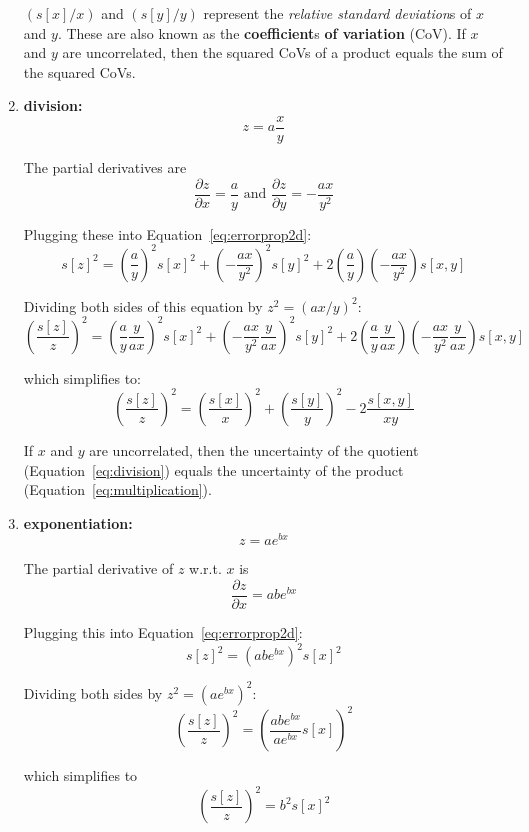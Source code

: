\begin{enumerate}
  $(s[x]/x)$ and $(s[y]/y)$ represent the \textit{relative standard
    deviation}s of $x$ and $y$. These are also known as the
  \textbf{coefficient}s \textbf{of variation} (CoV).  If $x$ and $y$
  are uncorrelated, then the squared CoVs of a product equals the sum
  of the squared CoVs.

\item{\bf division:}
  \[
  z = a \frac{x}{y}
  \]

  The partial derivatives are
  \[
  \frac{\partial z}{\partial x} = \frac{a}{y} \mbox{~and~}
  \frac{\partial z}{\partial y} = -\frac{a x}{y^2}
  \]

  Plugging these into Equation~\ref{eq:errorprop2d}:
  \[
  s[z]^2 = \left(\frac{a}{y}\right)^2 s[x]^2 +
  \left(-\frac{a x}{y^2}\right)^2 s[y]^2 +
  2\left(\frac{a}{y}\right)\left(-\frac{a x}{y^2}\right) s[x,y]
  \]

  Dividing both sides of this equation by $z^2 =
  \left(a x / y\right)^2$:
  \[
  \left(\frac{s[z]}{z}\right)^2 =
  \left(\frac{a}{y}\frac{y}{ax}\right)^2 s[x]^2 +
  \left(-\frac{a x}{y^2}\frac{y}{ax}\right)^2 s[y]^2 +
  2\left(\frac{a}{y}\frac{y}{ax}\right)
  \left(-\frac{a x}{y^2}\frac{y}{ax}\right) s[x,y]
  \]

  which simplifies to:
  \begin{equation}
    \left(\frac{s[z]}{z}\right)^2 = \left(\frac{s[x]}{x}\right)^2 +
    \left(\frac{s[y]}{y}\right)^2 - 2 \frac{s[x,y]}{x y}
    \label{eq:division}
  \end{equation}

  If $x$ and $y$ are uncorrelated, then the uncertainty of the
  quotient (Equation~\ref{eq:division}) equals the uncertainty of the
  product (Equation~\ref{eq:multiplication}).

\item{\bf exponentiation:}
  \[
  z = a e^{bx}
  \]

  The partial derivative of $z$ w.r.t. $x$ is
  \[
  \frac{\partial z}{\partial x} = ab e^{bx}
  \]

  Plugging this into Equation~\ref{eq:errorprop2d}:
  \[
  s[z]^2 = \left(ab e^{bx}\right)^2 s[x]^2
  \]

  Dividing both sides by $z^2 = \left(a e^{bx}\right)^2$:
  \[
  \left(\frac{s[z]}{z}\right)^2 =
  \left(\frac{ab e^{bx}}{a e^{bx}}s[x]\right)^2 
  \]

  which simplifies to
  \begin{equation}
    \left(\frac{s[z]}{z}\right)^2 = b^2 s[x]^2
    \label{eq:exponentiation}
  \end{equation}


\end{enumerate}

